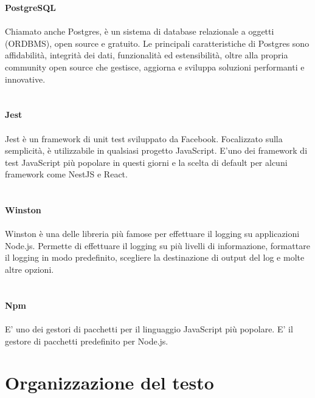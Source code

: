 \clearpage
\leavevmode\newline
\textbf{PostgreSQL}
\\\\
Chiamato anche Postgres, è un sistema di database relazionale a oggetti (ORDBMS), open source e 
gratuito.
Le principali caratteristiche di Postgres sono affidabilità, integrità dei dati, funzionalità ed estensibilità, 
oltre alla propria community open source che gestisce, aggiorna e sviluppa soluzioni performanti e innovative.
\\\\\\
\textbf{Jest}
\\\\
Jest è un framework di unit test sviluppato da Facebook. Focalizzato sulla semplicità, è utilizzabile in qualsiasi
progetto JavaScript. E'uno dei framework di test JavaScript più popolare in questi giorni e la scelta di default 
per alcuni framework come NestJS e React.
\\\\\\
\textbf{Winston}
\\\\
Winston è una delle libreria più famose per effettuare il logging su applicazioni Node.js. Permette di effettuare il logging
su più livelli di informazione, formattare il logging in modo predefinito, scegliere la destinazione di output del log e molte 
altre opzioni.
\\\\\\
\textbf{Npm}
\\\\
E' uno dei gestori di pacchetti per il linguaggio JavaScript più popolare. E' il gestore di pacchetti predefinito 
per Node.js.

\section{Organizzazione del testo}

